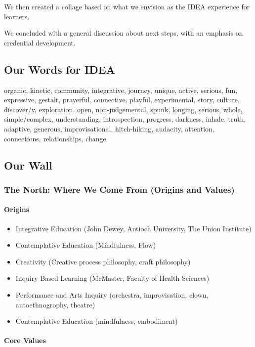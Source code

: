 \documentclass[letterpaper,10pt,headsepline]{scrreprt}
\begin{document}
We then created a collage based on what we envision as the IDEA
experience for learners.

We concluded with a general discussion about next steps, with an
emphasis on credential development.

\subsection{Our Words for IDEA}

organic, kinetic, community, integrative, journey, unique, active,
serious, fun, expressive, gestalt, prayerful, connective, playful,
experimental, story, culture, discover/y, exploration, open,
non-judgemental, spunk, longing, serious, whole, simple/complex,
understanding, introspection, progress, darkness, inhale, truth,
adaptive, generous, improvisational, hitch-hiking, audacity, attention,
connections, relationships, change

\subsection{Our Wall}

\subsubsection{The North: Where We Come From (Origins and Values)}

\paragraph{Origins}

\begin{itemize}
\itemsep1pt\parskip0pt
\item
  Integrative Education (John Dewey, Antioch University, The Union
  Institute)
\item
  Contemplative Education (Mindfulness, Flow)
\item
  Creativity (Creative process philosophy, craft philosophy)
\item
  Inquiry Based Learning (McMaster, Faculty of Health Sciences)
\item
  Performance and Arts Inquiry (orchestra, improvisation, clown,
  autoethnogrophy, theatre)
\item
  Contemplative Education (mindfulness, embodiment)
\end{itemize}

\paragraph{Core Values}
\end{document}
